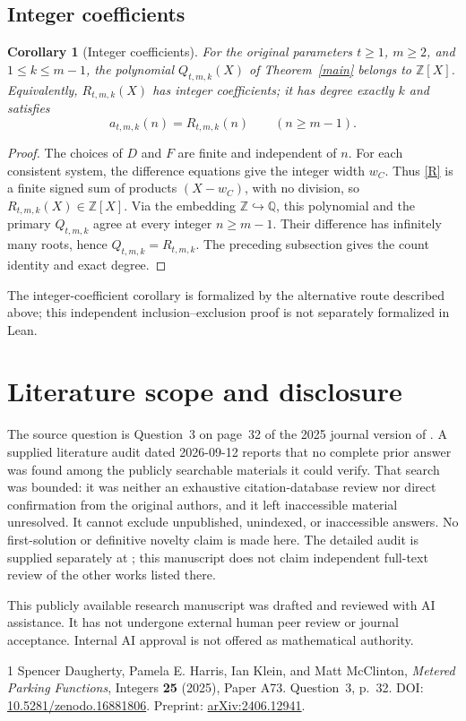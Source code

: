 \documentclass[11pt]{article}
\newtheorem{corollary}{Corollary}
\theoremstyle{definition}
\begin{document}
\subsection{Integer coefficients}
\begin{corollary}[Integer coefficients]
For the original parameters $t\ge1$, $m\ge2$, and $1\le k\le m-1$, the polynomial $Q_{t,m,k}(X)$ of Theorem~\ref{main} belongs to $\mathbb Z[X]$. Equivalently, $R_{t,m,k}(X)$ has integer coefficients; it has degree exactly $k$ and satisfies
\[
 a_{t,m,k}(n)=R_{t,m,k}(n)\qquad(n\ge m-1).
\]
\end{corollary}
\begin{proof}
The choices of $D$ and $F$ are finite and independent of $n$. For each consistent system, the difference equations give the integer width $w_C$. Thus \eqref{R} is a finite signed sum of products $(X-w_C)$, with no division, so $R_{t,m,k}(X)\in\mathbb Z[X]$. Via the embedding $\mathbb Z\hookrightarrow\mathbb Q$, this polynomial and the primary $Q_{t,m,k}$ agree at every integer $n\ge m-1$. Their difference has infinitely many roots, hence $Q_{t,m,k}=R_{t,m,k}$. The preceding subsection gives the count identity and exact degree.
\end{proof}
The integer-coefficient corollary is formalized by the alternative route described above; this independent inclusion--exclusion proof is not separately formalized in Lean.

\section*{Literature scope and disclosure}
The source question is Question~3 on page~32 of the 2025 journal version of \cite{metered}. A supplied literature audit dated 2026-09-12 reports that no complete prior answer was found among the publicly searchable materials it could verify. That search was bounded: it was neither an exhaustive citation-database review nor direct confirmation from the original authors, and it left inaccessible material unresolved. It cannot exclude unpublished, unindexed, or inaccessible answers. No first-solution or definitive novelty claim is made here. The detailed audit is supplied separately at ; this manuscript does not claim independent full-text review of the other works listed there.

This publicly available research manuscript was drafted and reviewed with AI assistance. It has not undergone external human peer review or journal acceptance. Internal AI approval is not offered as mathematical authority.

\begin{thebibliography}{1}
Spencer Daugherty, Pamela E. Harris, Ian Klein, and Matt McClinton,
\emph{Metered Parking Functions}, Integers \textbf{25} (2025), Paper A73.
Question~3, p.~32.
DOI: \href{https://doi.org/10.5281/zenodo.16881806}{10.5281/zenodo.16881806}.
Preprint: \href{https://arxiv.org/abs/2406.12941}{arXiv:2406.12941}.
\end{thebibliography}
\end{document}
